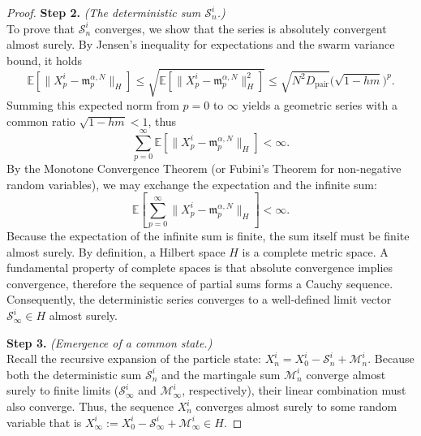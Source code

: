 \documentclass[12pt]{amsart}
\numberwithin{equation}{section}
\begin{document}
\begin{proof}
\textbf{Step 2.} \textit{(The deterministic sum $\mathcal{S}_n^i$.)} \\
To prove that $\mathcal{S}_n^i$ converges, we show that the series is absolutely convergent almost surely. By Jensen's inequality for expectations and the swarm variance bound, it holds
\begin{equation*}
    \mathbb{E}[\|X_p^i - \mathfrak{m}_p^{\alpha, N}\|_H] \le \sqrt{\mathbb{E}[\|X_p^i - \mathfrak{m}_p^{\alpha, N}\|_H^2]} \le \sqrt{N^2D_{\text{pair}}} \big( \sqrt{1-hm} \big)^p.
\end{equation*}
Summing this expected norm from $p=0$ to $\infty$ yields a geometric series with a common ratio $\sqrt{1-hm} < 1$, thus
\begin{equation*}
    \sum_{p=0}^\infty \mathbb{E}[\|X_p^i - \mathfrak{m}_p^{\alpha, N}\|_H] < \infty.
\end{equation*}
By the Monotone Convergence Theorem (or Fubini's Theorem for non-negative random variables), we may exchange the expectation and the infinite sum:
\begin{equation*}
    \mathbb{E} \left[ \sum_{p=0}^\infty \|X_p^i - \mathfrak{m}_p^{\alpha, N}\|_H \right] < \infty.
\end{equation*}
Because the expectation of the infinite sum is finite, the sum itself must be finite almost surely. By definition, a Hilbert space $H$ is a complete metric space. A fundamental property of complete spaces is that absolute convergence implies convergence, therefore the sequence of partial sums forms a Cauchy sequence. Consequently, the deterministic series converges to a well-defined limit vector $\mathcal{S}_\infty^i \in H$ almost surely.

\textbf{Step 3.} \textit{(Emergence of a common state.)} \\
Recall the recursive expansion of the particle state: $X_n^i = X_0^i - \mathcal{S}_n^i + \mathcal{M}_n^i$. Because both the deterministic sum $\mathcal{S}_n^i$ and the martingale sum $\mathcal{M}_n^i$ converge almost surely to finite limits ($\mathcal{S}_\infty^i$ and $\mathcal{M}_\infty^i$, respectively), their linear combination must also converge. Thus, the sequence $X_n^i$ converges almost surely to some  random variable that is $X_\infty^i := X_0^i - \mathcal{S}_\infty^i + \mathcal{M}_\infty^i \in H$.


\end{proof}
\end{document}
